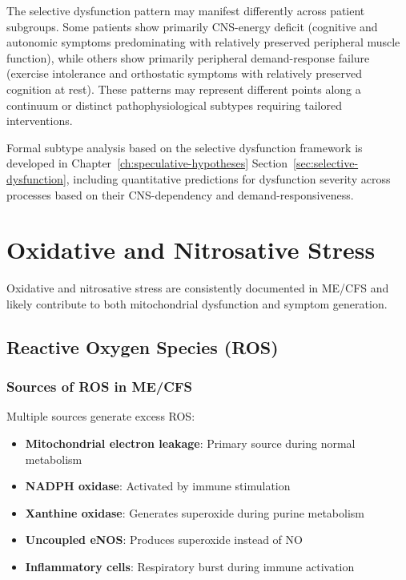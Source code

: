 \begin{observation}
The selective dysfunction pattern may manifest differently across patient subgroups. Some patients show primarily CNS-energy deficit (cognitive and autonomic symptoms predominating with relatively preserved peripheral muscle function), while others show primarily peripheral demand-response failure (exercise intolerance and orthostatic symptoms with relatively preserved cognition at rest). These patterns may represent different points along a continuum or distinct pathophysiological subtypes requiring tailored interventions.

Formal subtype analysis based on the selective dysfunction framework is developed in Chapter~\ref{ch:speculative-hypotheses} Section~\ref{sec:selective-dysfunction}, including quantitative predictions for dysfunction severity across processes based on their CNS-dependency and demand-responsiveness.
\end{observation}

\section{Oxidative and Nitrosative Stress}
\label{sec:oxidative-stress}

Oxidative and nitrosative stress are consistently documented in ME/CFS and likely contribute to both mitochondrial dysfunction and symptom generation.

\subsection{Reactive Oxygen Species (ROS)}
\label{sec:ros}

\subsubsection{Sources of ROS in ME/CFS}

Multiple sources generate excess ROS:

\begin{itemize}
    \item \textbf{Mitochondrial electron leakage}: Primary source during normal metabolism
    \item \textbf{NADPH oxidase}: Activated by immune stimulation
    \item \textbf{Xanthine oxidase}: Generates superoxide during purine metabolism
    \item \textbf{Uncoupled eNOS}: Produces superoxide instead of NO
    \item \textbf{Inflammatory cells}: Respiratory burst during immune activation
\end{itemize}

